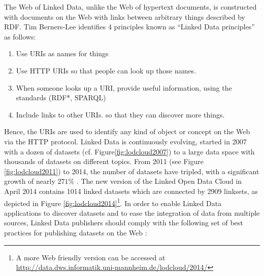 The Web of Linked Data, unlike the Web of hypertext documents, is constructed with documents on the Web with links between arbitrary things described by RDF. Tim Berners-Lee \cite{timld} identifies 4 principles known as ``Linked Data principles'' as follows:
\begin{enumerate}
\item Use URIs as names for things
\item Use HTTP URIs so that people can look up those names.
\item When someone looks up a URI, provide useful information, using the standards (RDF*, SPARQL)
\item Include links to other URIs. so that they can discover more things.
\end{enumerate}
Hence, the URIs are used to identify any kind of object or concept on the Web via the HTTP protocol. Linked Data is continuously evolving, started in 2007 with a dozen of datasets (cf. Figure\ref{fig:lodcloud2007}) to a large data space with thousands of datasets on different topics. From 2011 (see Figure \ref{fig:lodcloud2011})\cite{jentzsch2011} to 2014, the number of datasets have tripled, with a significant growth of nearly $271\%$  \cite{max2014}. The new version of the Linked Open Data Cloud in April 2014 contains 1014 linked datasets which are connected by 2909 linksets, as depicted in Figure \ref{fig:lodcloud2014}\footnote{A more Web friendly version can be accessed at \url{http://data.dws.informatik.uni-mannheim.de/lodcloud/2014/}}. In order to enable
Linked Data applications to discover datasets and to ease the integration of data from multiple sources, Linked Data publishers should comply with the following set of best practices for publishing datasets on the Web \cite{Heath2011}:

